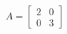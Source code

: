 \documentclass[preview]{standalone}
\begin{document}
\begin{align*}
A =  \begin{bmatrix} 2 & 0\\ 0 & 3 \end{bmatrix}
\end{align*}
\end{document}
